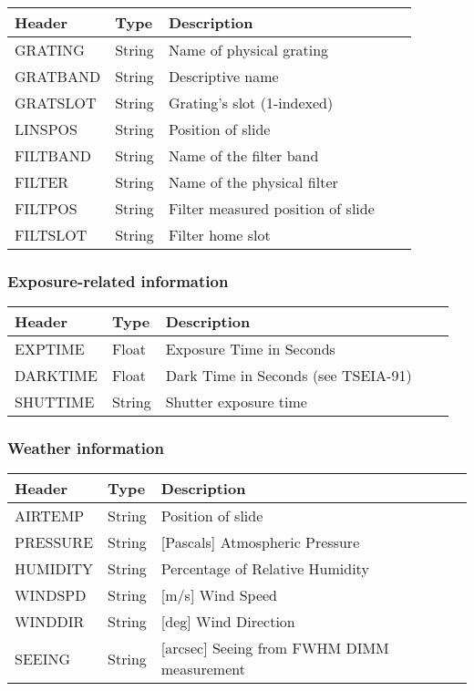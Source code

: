 \begin{tabular}{l l l l l}
\hline
Header & Type & Description \\
\hline
GRATING & String & Name of physical grating \\
GRATBAND & String & Descriptive name \\
GRATSLOT & String & Grating's slot (1-indexed) \\
LINSPOS & String & Position of slide \\
FILTBAND & String & Name of the filter band \\
FILTER & String & Name of the physical filter \\
FILTPOS & String & Filter measured position of slide \\
FILTSLOT & String & Filter home slot \\
\hline
\end{tabular}


\subsubsection{Exposure-related information}


\begin{tabular}{l l l l l}
\hline
Header & Type & Description \\
\hline
EXPTIME & Float & Exposure Time in Seconds \\
DARKTIME & Float & Dark Time in Seconds (see TSEIA-91) \\
SHUTTIME & String & Shutter exposure time \\
\hline
\end{tabular}


\subsubsection{Weather information}


\begin{tabular}{l l l l l}
\hline
Header & Type & Description \\
\hline
AIRTEMP & String & Position of slide \\
PRESSURE & String & [Pascals] Atmospheric Pressure \\
HUMIDITY & String & Percentage of Relative Humidity \\
WINDSPD & String & [m/s] Wind Speed \\
WINDDIR & String & [deg] Wind Direction \\
SEEING & String & [arcsec] Seeing from FWHM DIMM measurement \\
\hline
\end{tabular}


